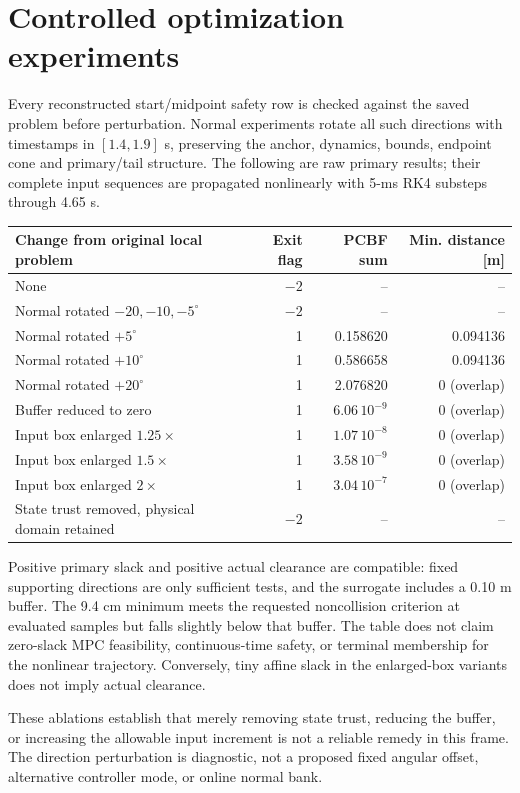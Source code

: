 \documentclass[11pt]{article}
\begin{document}
\section{Controlled optimization experiments}
Every reconstructed start/midpoint safety row is checked against the saved
problem before perturbation. Normal experiments rotate all such directions
with timestamps in $[1.4,1.9]$ s, preserving the anchor, dynamics, bounds,
endpoint cone and primary/tail structure. The following are raw primary
results; their complete input sequences are propagated nonlinearly with
5-ms RK4 substeps through 4.65 s.
\begin{center}\small
\begin{tabular}{lrrr}
\toprule
Change from original local problem & Exit flag & PCBF sum & Min. distance [m]\\
\midrule
None & $-2$ & -- & --\\
Normal rotated $-20,-10,-5^\circ$ & $-2$ & -- & --\\
Normal rotated $+5^\circ$ & 1 & 0.158620 & 0.094136\\
Normal rotated $+10^\circ$ & 1 & 0.586658 & 0.094136\\
Normal rotated $+20^\circ$ & 1 & 2.076820 & 0 (overlap)\\
Buffer reduced to zero & 1 & $6.06\,10^{-9}$ & 0 (overlap)\\
Input box enlarged $1.25\times$ & 1 & $1.07\,10^{-8}$ & 0 (overlap)\\
Input box enlarged $1.5\times$ & 1 & $3.58\,10^{-9}$ & 0 (overlap)\\
Input box enlarged $2\times$ & 1 & $3.04\,10^{-7}$ & 0 (overlap)\\
State trust removed, physical domain retained & $-2$ & -- & --\\
\bottomrule
\end{tabular}
\end{center}
Positive primary slack and positive actual clearance are compatible: fixed
supporting directions are only sufficient tests, and the surrogate includes a
0.10 m buffer. The 9.4 cm minimum meets the requested noncollision criterion
at evaluated samples but falls slightly below that buffer. The table does not
claim zero-slack MPC feasibility, continuous-time safety, or terminal
membership for the nonlinear trajectory. Conversely, tiny affine slack in
the enlarged-box variants does not imply actual clearance.

These ablations establish that merely removing state trust, reducing the
buffer, or increasing the allowable input increment is not a reliable remedy
in this frame. The direction perturbation is diagnostic, not a proposed
fixed angular offset, alternative controller mode, or online normal bank.
\end{document}
